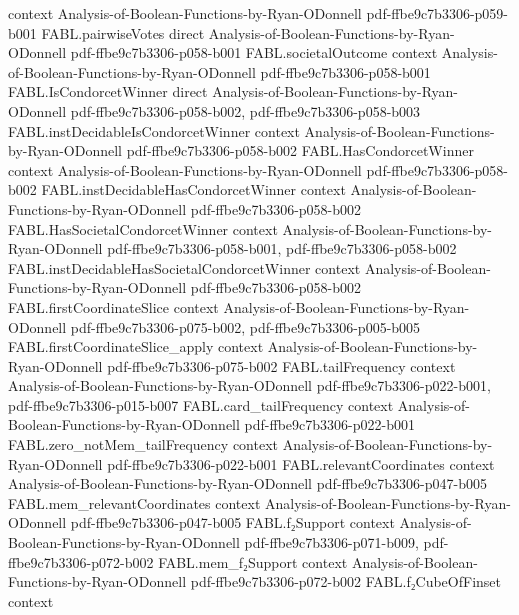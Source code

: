 \begin{theorem}
  {context}
  {Analysis-of-Boolean-Functions-by-Ryan-ODonnell}
  {pdf-ffbe9c7b3306-p059-b001}
\proofstep
  {FABL.pairwiseVotes}
  {direct}
  {Analysis-of-Boolean-Functions-by-Ryan-ODonnell}
  {pdf-ffbe9c7b3306-p058-b001}
\proofstep
  {FABL.societalOutcome}
  {context}
  {Analysis-of-Boolean-Functions-by-Ryan-ODonnell}
  {pdf-ffbe9c7b3306-p058-b001}
\proofstep
  {FABL.IsCondorcetWinner}
  {direct}
  {Analysis-of-Boolean-Functions-by-Ryan-ODonnell}
  {pdf-ffbe9c7b3306-p058-b002,
    pdf-ffbe9c7b3306-p058-b003}
\proofstep
  {FABL.instDecidableIsCondorcetWinner}
  {context}
  {Analysis-of-Boolean-Functions-by-Ryan-ODonnell}
  {pdf-ffbe9c7b3306-p058-b002}
\proofstep
  {FABL.HasCondorcetWinner}
  {context}
  {Analysis-of-Boolean-Functions-by-Ryan-ODonnell}
  {pdf-ffbe9c7b3306-p058-b002}
\proofstep
  {FABL.instDecidableHasCondorcetWinner}
  {context}
  {Analysis-of-Boolean-Functions-by-Ryan-ODonnell}
  {pdf-ffbe9c7b3306-p058-b002}
\proofstep
  {FABL.HasSocietalCondorcetWinner}
  {context}
  {Analysis-of-Boolean-Functions-by-Ryan-ODonnell}
  {pdf-ffbe9c7b3306-p058-b001,
    pdf-ffbe9c7b3306-p058-b002}
\proofstep
  {FABL.instDecidableHasSocietalCondorcetWinner}
  {context}
  {Analysis-of-Boolean-Functions-by-Ryan-ODonnell}
  {pdf-ffbe9c7b3306-p058-b002}
\proofstep
  {FABL.firstCoordinateSlice}
  {context}
  {Analysis-of-Boolean-Functions-by-Ryan-ODonnell}
  {pdf-ffbe9c7b3306-p075-b002,
    pdf-ffbe9c7b3306-p005-b005}
\proofstep
  {FABL.firstCoordinateSlice_apply}
  {context}
  {Analysis-of-Boolean-Functions-by-Ryan-ODonnell}
  {pdf-ffbe9c7b3306-p075-b002}
\proofstep
  {FABL.tailFrequency}
  {context}
  {Analysis-of-Boolean-Functions-by-Ryan-ODonnell}
  {pdf-ffbe9c7b3306-p022-b001,
    pdf-ffbe9c7b3306-p015-b007}
\proofstep
  {FABL.card_tailFrequency}
  {context}
  {Analysis-of-Boolean-Functions-by-Ryan-ODonnell}
  {pdf-ffbe9c7b3306-p022-b001}
\proofstep
  {FABL.zero_notMem_tailFrequency}
  {context}
  {Analysis-of-Boolean-Functions-by-Ryan-ODonnell}
  {pdf-ffbe9c7b3306-p022-b001}
\proofstep
  {FABL.relevantCoordinates}
  {context}
  {Analysis-of-Boolean-Functions-by-Ryan-ODonnell}
  {pdf-ffbe9c7b3306-p047-b005}
\proofstep
  {FABL.mem_relevantCoordinates}
  {context}
  {Analysis-of-Boolean-Functions-by-Ryan-ODonnell}
  {pdf-ffbe9c7b3306-p047-b005}
\proofstep
  {FABL.f₂Support}
  {context}
  {Analysis-of-Boolean-Functions-by-Ryan-ODonnell}
  {pdf-ffbe9c7b3306-p071-b009,
    pdf-ffbe9c7b3306-p072-b002}
\proofstep
  {FABL.mem_f₂Support}
  {context}
  {Analysis-of-Boolean-Functions-by-Ryan-ODonnell}
  {pdf-ffbe9c7b3306-p072-b002}
\proofstep
  {FABL.f₂CubeOfFinset}
  {context}

\end{theorem}
